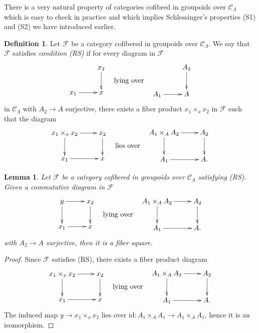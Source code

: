 \documentclass{stacks-project}
\theoremstyle{plain}
\newtheorem{lemma}[subsection]{Lemma}
\theoremstyle{definition}
\newtheorem{definition}[subsection]{Definition}
\theoremstyle{remark}
\numberwithin{equation}{subsection}
\begin{document}
\noindent
There is a very natural property of categories cofibred in groupoids
over $\mathcal{C}_\Lambda$ which is easy to check in practice
and which implies Schlessinger's properties (S1) and (S2) we
have introduced earlier.

\begin{definition}
\label{definition-RS}
Let $\mathcal{F}$ be a category cofibered in groupoids over $\mathcal
C_\Lambda$.  We say that $\mathcal{F}$ satisfies {\it condition (RS)}
if for every diagram in $\mathcal{F}$
$$
\vcenter{
\xymatrix{
           & x_2 \ar[d] \\
x_1 \ar[r] & x
}
}
\quad\text{lying over}\quad
\vcenter{
\xymatrix{
           & A_2 \ar[d] \\
A_1 \ar[r] & A
}
}
$$
in $\mathcal{C}_\Lambda$ with $A_2 \to A$ surjective, there exists a
fiber product $x_1 \times_x x_2$ in $\mathcal{F}$ such that the diagram
$$
\vcenter{
\xymatrix{
x_1 \times_x x_2 \ar[r] \ar[d] & x_2 \ar[d] \\
x_1 \ar[r]      & x
}
}
\quad\text{lies over}\quad
\vcenter{
\xymatrix{
A_1 \times_A A_2 \ar[r] \ar[d] & A_2 \ar[d] \\
A_1 \ar[r]      & A.
}
}
$$
\end{definition}

\begin{lemma}
\label{lemma-RS-fiber-square}
Let $\mathcal{F}$ be a category cofibered in groupoids over
$\mathcal{C}_\Lambda$ satisfying (RS). Given a commutative diagram
in $\mathcal{F}$
$$
\vcenter{
\xymatrix{
y \ar[r] \ar[d] & x_2 \ar[d]   \\
x_1 \ar[r]      & x
}
}
\quad\text{lying over}\quad
\vcenter{
\xymatrix{
A_1 \times_A A_2 \ar[r] \ar[d] & A_2 \ar[d] \\
A_1 \ar[r]      & A.
}
}
$$
with $A_2 \to A$ surjective, then it is a fiber square.
\end{lemma}

\begin{proof}
Since $\mathcal{F}$ satisfies (RS), there exists a fiber product diagram
$$
\vcenter{
\xymatrix{
x_1 \times_x x_2 \ar[r] \ar[d] & x_2 \ar[d] \\
x_1 \ar[r]      & x
}
}
\quad\text{lying over}\quad
\vcenter{
\xymatrix{
A_1 \times_A A_2 \ar[r] \ar[d] & A_2 \ar[d] \\
A_1 \ar[r]      & A.
}
}
$$
The induced map $y \to x_1 \times_x x_2$ lies over
$\text{id} : A_1 \times_A A_1 \to A_1 \times_A A_1$, hence it is an
isomorphism.
\end{proof}
\end{document}
